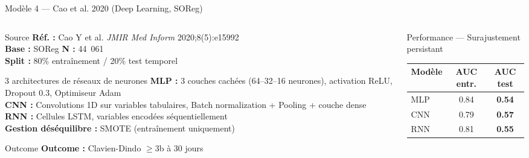 \documentclass[aspectratio=169]{beamer}
\begin{document}
\begin{frame}[shrink=5]{Modèle 4 --- Cao et al. 2020 (Deep Learning, SOReg)}
  \begin{columns}[T]
    \begin{column}{0.50\textwidth}
      \begin{block}{Source}
        \footnotesize
        \textbf{Réf. :} Cao Y et al. \textit{JMIR Med Inform} 2020;8(5):e15992\\
        \textbf{Base :} SOReg \quad \textbf{N :} 44~061\\
        \textbf{Split :} 80\% entraînement / 20\% test temporel
      \end{block}
      \vspace{0.15em}
      \begin{block}{3 architectures de réseaux de neurones}
        \footnotesize
        \textbf{MLP :} 3 couches cachées (64--32--16 neurones),
        activation ReLU, Dropout 0.3, Optimiseur Adam\\[3pt]
        \textbf{CNN :} Convolutions 1D sur variables tabulaires,
        Batch normalization + Pooling + couche dense\\[3pt]
        \textbf{RNN :} Cellules LSTM,
        variables encodées séquentiellement\\[3pt]
        \textbf{Gestion déséquilibre :} SMOTE (entraînement uniquement)
      \end{block}
      \vspace{0.15em}
      \begin{block}{Outcome}
        \footnotesize
        \textbf{Outcome :} Clavien-Dindo $\geq$3b à 30 jours
      \end{block}
    \end{column}
    \begin{column}{0.47\textwidth}
      \begin{alertblock}{Performance --- Surajustement persistant}
        \footnotesize
        \begin{tabular}{lcc}
          \toprule
          \textbf{Modèle} & \textbf{AUC entr.} & \textbf{AUC test} \\
          \midrule
          MLP & 0.84 & \textcolor{rougealerte}{\textbf{0.54}} \\
          CNN & 0.79 & \textcolor{rougealerte}{\textbf{0.57}} \\
          RNN & 0.81 & \textcolor{rougealerte}{\textbf{0.55}} \\
          \midrule

\end{tabular}
\end{alertblock}
\end{column}
\end{columns}
\end{frame}
\end{document}
